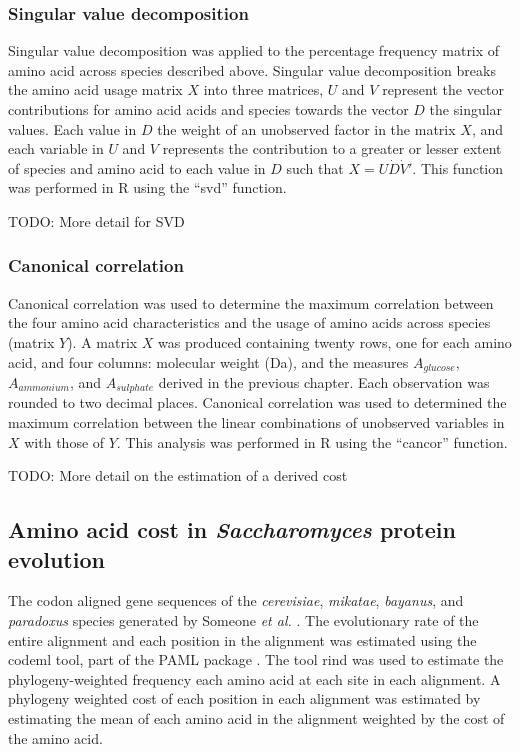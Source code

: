 \subsubsection{Singular value decomposition}
 
Singular value decomposition was applied to the percentage frequency matrix of amino acid across species described above. Singular value decomposition breaks the amino acid usage matrix $X$ into three matrices, $U$ and $V$ represent the vector contributions for amino acid acids and species towards the vector $D$ the singular values. Each value in $D$ the weight of an unobserved factor in the matrix $X$, and each variable in $U$ and $V$  represents the contribution to a greater or lesser extent of species and amino acid to each value in $D$ such that $X = U \dot D \dot V'$. This function was performed in R using the ``svd'' function.

TODO: More detail for SVD

\subsubsection{Canonical correlation}

Canonical correlation was used to determine the maximum correlation between the four amino acid characteristics and the usage of amino acids across species (matrix $Y$). A matrix $X$ was produced containing twenty rows, one for each amino acid, and four columns: molecular weight (Da), and the measures $A_{glucose}$, $A_{ammonium}$, and $A_{sulphate}$ derived in the previous chapter. Each observation was rounded to two decimal places. Canonical correlation was used to determined the maximum correlation between the linear combinations of unobserved variables in $X$ with those of $Y$. This analysis was performed in R using the ``cancor'' function.

TODO: More detail on the estimation of a derived cost

\subsection{Amino acid cost in \emph{Saccharomyces} protein evolution}

The codon aligned gene sequences of the \emph{cerevisiae}, \emph{mikatae}, \emph{bayanus}, and \emph{paradoxus} species generated by Someone \emph{et al.} \cite{wall2005}. The evolutionary rate of the entire alignment and each position in the alignment was estimated using the codeml tool, part of the PAML package \cite{yang2007}. The tool rind \cite{bruno1996} was used to estimate the phylogeny-weighted frequency each amino acid at each site in each alignment. A phylogeny weighted cost of each position in each alignment was estimated by estimating the mean of each amino acid in the alignment weighted by the cost of the amino acid.

